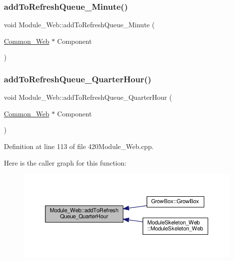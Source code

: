 \subsubsection{\texorpdfstring{add\+To\+Refresh\+Queue\+\_\+\+Minute()}{addToRefreshQueue\_Minute()}\hspace{0.1cm}{\footnotesize\ttfamily [2/2]}}
{\footnotesize\ttfamily void Module\+\_\+\+Web\+::add\+To\+Refresh\+Queue\+\_\+\+Minute (\begin{DoxyParamCaption}\item[{\hyperlink{class_common___web}{Common\+\_\+\+Web} $\ast$}]{Component }\end{DoxyParamCaption})}

\mbox{\label{class_module___web_ab6e5503496c826837eccf104c1fca09b}} 
\subsubsection{\texorpdfstring{add\+To\+Refresh\+Queue\+\_\+\+Quarter\+Hour()}{addToRefreshQueue\_QuarterHour()}\hspace{0.1cm}{\footnotesize\ttfamily [1/2]}}
{\footnotesize\ttfamily void Module\+\_\+\+Web\+::add\+To\+Refresh\+Queue\+\_\+\+Quarter\+Hour (\begin{DoxyParamCaption}\item[{\hyperlink{class_common___web}{Common\+\_\+\+Web} $\ast$}]{Component }\end{DoxyParamCaption})}



Definition at line 113 of file 420\+Module\+\_\+\+Web.\+cpp.

Here is the caller graph for this function\+:
\nopagebreak
\begin{figure}[H]
\begin{center}
\leavevmode
\includegraphics[width=350pt]{class_module___web_ab6e5503496c826837eccf104c1fca09b_icgraph}
\end{center}
\end{figure}
\mbox{\label{class_module___web_ab6e5503496c826837eccf104c1fca09b}} 
